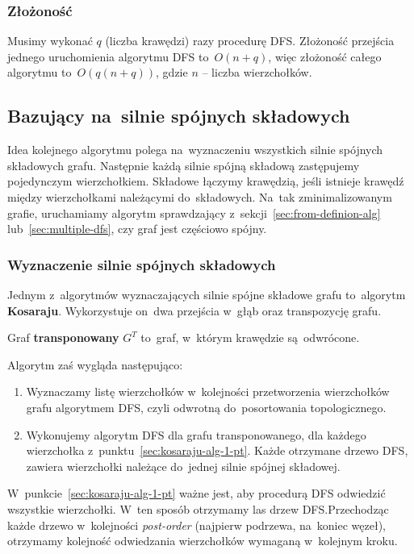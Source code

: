 \documentclass[a4paper,12pt]{mwart}
\begin{document}
\subsubsection{Złożoność}

Musimy wykonać $q$ (liczba krawędzi) razy procedurę DFS\@. Złożoność przejścia
jednego uruchomienia algorytmu DFS to~$O(n + q)$, więc złożoność całego
algorytmu to~$O(q(n + q))$, gdzie $n$ -- liczba wierzchołków.

\subsection{Bazujący na~silnie spójnych składowych}

Idea kolejnego algorytmu polega na~wyznaczeniu wszystkich silnie spójnych
składowych grafu. Następnie każdą silnie spójną składową zastępujemy
pojedynczym wierzchołkiem. Składowe łączymy krawędzią, jeśli istnieje krawędź
między wierzchołkami należącymi do~składowych. Na~tak zminimalizowanym grafie,
uruchamiamy algorytm sprawdzający z~sekcji~\ref{sec:from-definion-alg}
lub~\ref{sec:multiple-dfs}, czy graf jest częściowo spójny.


\subsubsection{Wyznaczenie silnie spójnych składowych}

Jednym z~algorytmów wyznaczających silnie spójne składowe grafu to~algorytm
\textbf{Kosaraju}. Wykorzystuje on~dwa przejścia w~głąb oraz transpozycję
grafu.

Graf \textbf{transponowany} $G^T$ to~graf, w~którym krawędzie są~odwrócone.

Algorytm zaś wygląda następująco:

\begin{enumerate}
\item\label{sec:kosaraju-alg-1-pt} Wyznaczamy listę wierzchołków w~kolejności
  przetworzenia wierzchołków grafu algorytmem DFS, czyli odwrotną
  do~posortowania topologicznego.
\item\label{sec:kosaraju-alg-2-pt} Wykonujemy algorytm DFS dla grafu
  transponowanego, dla każdego wierzchołka
  z~punktu~\ref{sec:kosaraju-alg-1-pt}. Każde otrzymane drzewo DFS, zawiera
  wierzchołki należące do~jednej silnie spójnej składowej.
\end{enumerate}

W~punkcie~\ref{sec:kosaraju-alg-1-pt} ważne jest, aby procedurą DFS odwiedzić
wszystkie wierzchołki. W~ten sposób otrzymamy las drzew DFS.\@ Przechodząc
każde drzewo w~kolejności \emph{post-order} (najpierw podrzewa, na~koniec
węzeł), otrzymamy kolejność odwiedzania wierzchołków wymaganą w~kolejnym kroku.
\end{document}
